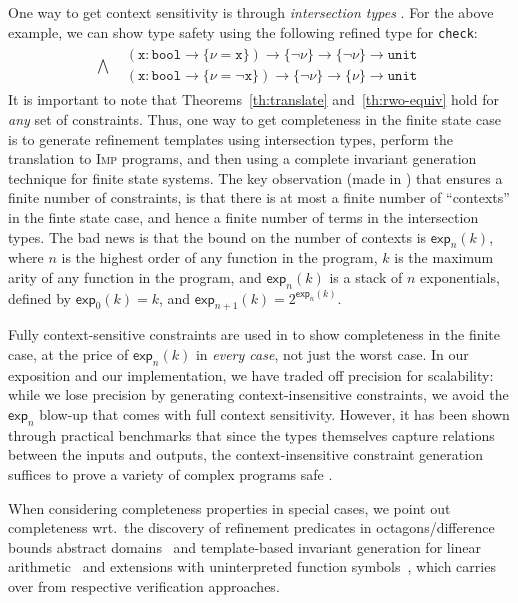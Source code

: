 \documentclass[nocopyrightspace]{sigplanconf}
\def\set#1{{\{ #1\}}}
\newcommand{\ttx}{\mathtt{x}}
\def\valu{\nu}
\def\ttbool{\mathtt{bool}}
\newcommand{\ttunit}{\mathtt{unit}}
\newcommand{\ilang}{\textsc{Imp}\xspace}
\begin{document}
One way to get context sensitivity is through \emph{intersection types} 
\cite{FreemanPfenning91,Dunfield,NaikPalsberg,KobayashiPOPL09}.
For the above example, we can show type safety 
using the following refined type for \verb+check+:
\[
\begin{array}{cl}
\bigwedge & \begin{array}{l}
            (\ttx: \ttbool \rightarrow \set{\valu = \ttx})\rightarrow \set{\lnot \valu}\rightarrow \set{\lnot\valu}\rightarrow \ttunit\\
            (\ttx: \ttbool \rightarrow \set{\valu = \lnot\ttx})\rightarrow \set{\lnot \valu}\rightarrow \set{\valu}\rightarrow \ttunit
            \end{array}
\end{array}
\]
It is important to note that Theorems~\ref{th:translate} and~\ref{th:rwo-equiv} 
hold for \emph{any} set of constraints.
Thus, one way to get completeness in the finite state case 
is to generate refinement templates using intersection types, 
perform the translation to \ilang programs, 
and then using a complete invariant generation 
technique for finite state systems.
The key observation (made in \cite{KobayashiPOPL09}) 
that ensures a finite number of constraints, is 
that there is at most a finite number of ``contexts'' in the finte state case,
and hence a finite number of terms in the intersection types.
The bad news is that the bound on the number of contexts is 
$\mathsf{exp}_n(k)$, where $n$ is the highest order of any 
function in the program, $k$ is the maximum arity of any function in the program,
and $\mathsf{exp}_n(k)$ is a stack of $n$ exponentials, defined by 
$\mathsf{exp}_0(k) = k$, and $\mathsf{exp}_{n+1}(k) = 2^{\mathsf{exp}_n(k)}$.

Fully context-sensitive constraints are used in \cite{KobayashiPOPL09}
to show completeness in the finite case, at the price of
$\mathsf{exp}_n(k)$ in {\em every case}, not just the worst case.
In our exposition and our implementation, we have traded 
off precision for scalability: while we lose precision 
by generating context-insensitive constraints, we avoid 
the $\mathsf{exp}_n$ blow-up that comes with full context sensitivity.
However, it has been shown through practical benchmarks that since the types themselves capture
relations between the inputs and outputs, the context-insensitive
constraint generation suffices to prove a variety of complex programs safe
\cite{LiquidPLDI08, LiquidPLDI09, GordonRefinement09}.

When considering completeness properties in special cases, we point
out completeness wrt.~the discovery of refinement predicates in
octagons/difference bounds abstract domains~\cite{MineOctagon06} and
template-based invariant generation for linear
arithmetic~\cite{ColonCAV03} and extensions with uninterpreted
function symbols~\cite{BeyerVMCAI07}, which carries over from
respective verification approaches. 
\end{document}

